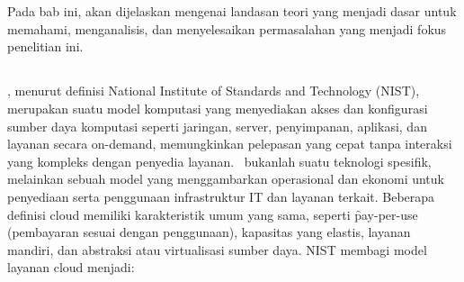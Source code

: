 \chapter{\babDua}

Pada bab ini, akan dijelaskan mengenai landasan teori yang menjadi dasar untuk memahami, menganalisis, dan menyelesaikan permasalahan yang menjadi fokus penelitian ini.

\section{\cc}
\cc, menurut definisi National Institute of Standards and Technology (NIST), merupakan suatu model komputasi yang menyediakan akses dan konfigurasi sumber daya komputasi seperti jaringan, server, penyimpanan, aplikasi, dan layanan secara on-demand, memungkinkan pelepasan yang cepat tanpa interaksi yang kompleks dengan penyedia layanan\cite{mell2009nist}. \cc\ bukanlah suatu teknologi spesifik, melainkan sebuah model yang menggambarkan operasional dan ekonomi untuk penyediaan serta penggunaan infrastruktur IT dan layanan terkait. Beberapa definisi cloud memiliki karakteristik umum yang sama, seperti \f{pay-per-use} (pembayaran sesuai dengan penggunaan), kapasitas yang elastis, layanan mandiri, dan abstraksi atau virtualisasi sumber daya\cite{Buyya_Broberg_Goscinski_2011}. NIST membagi model layanan cloud menjadi\cite{mell2009nist}:
